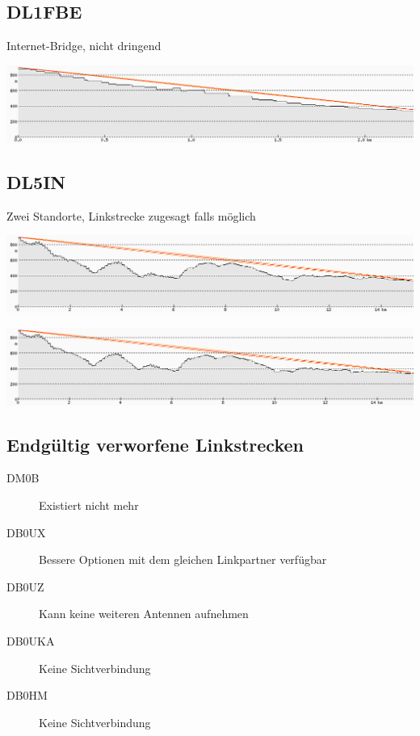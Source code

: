 \documentclass[a4paper]{scrartcl}
\begin{document}
\subsection{DL1FBE}
Internet-Bridge, nicht dringend

\includegraphics[width=\linewidth]{Bilder/Profil_DL1FBE}

\subsection{DL5IN}
Zwei Standorte, Linkstrecke zugesagt falls m\"oglich

\includegraphics[width=\linewidth]{Bilder/Profil_DL5IN_48_877408_8_507792.png}

\includegraphics[width=\linewidth]{Bilder/Profil_DL5IN_48_877956_8_511058.png}

\subsection{Endg\"ultig verworfene Linkstrecken}
\begin{description}
    \item[DM0B] Existiert nicht mehr
    \item[DB0UX] Bessere Optionen mit dem gleichen Linkpartner verf\"ugbar
    \item[DB0UZ] Kann keine weiteren Antennen aufnehmen
    \item[DB0UKA] Keine Sichtverbindung
    \item[DB0HM] Keine Sichtverbindung
\end{description}
\end{document}
